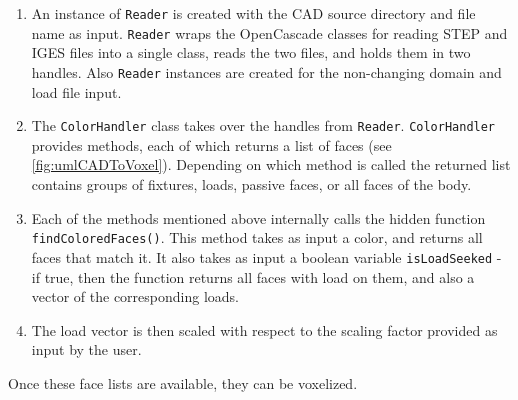 \begin{enumerate}
	\item An instance of \lstinline|Reader| is created with the CAD source directory and file name as input. \lstinline|Reader| wraps the OpenCascade classes for reading STEP and IGES files into a single class, reads the two files, and holds them in two handles. Also \lstinline|Reader| instances are created for the non-changing domain and load file input.
	\item The \lstinline|ColorHandler| class takes over the handles from \lstinline|Reader|. \lstinline|ColorHandler| provides methods, each of which returns a list of faces (see \autoref{fig:umlCADToVoxel}). Depending on which method is called the returned list contains groups of fixtures, loads, passive faces, or all faces of the body.
	\item Each of the methods mentioned above internally calls the hidden function \lstinline|findColoredFaces()|. This method takes as input a color, and returns all faces that match it. It also takes as input a boolean variable \lstinline|isLoadSeeked| - if true, then the function returns all faces with load on them, and also a vector of the corresponding loads.
	\item The load vector is then scaled with respect to the scaling factor provided as input by the user.
\end{enumerate}

Once these face lists are available, they can be voxelized.
